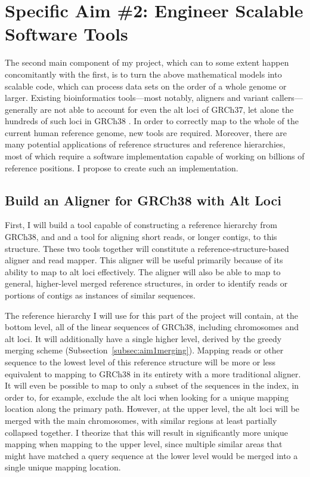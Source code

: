 \documentclass[11pt,proposal]{ucthesis}
\begin{document}
        
\section{Specific Aim \#2: Engineer Scalable Software Tools}
\label{sec:aim2}

The second main component of my project, which can to some extent happen concomitantly with the first, is to turn the above mathematical models into scalable code, which can process data sets on the order of a whole genome or larger. Existing bioinformatics tools---most notably, aligners and variant callers---generally are not able to account for even the alt loci of GRCh37, let alone the hundreds of such loci in GRCh38 \cite{church2014story}. In order to correctly map to the whole of the current human reference genome, new tools are required. Moreover, there are many potential applications of reference structures and reference hierarchies, most of which require a software implementation capable of working on billions of reference positions. I propose to create such an implementation.

\subsection{Build an Aligner for GRCh38 with Alt Loci}
\label{subsec:aim2aligner}

First, I will build a tool capable of constructing a reference hierarchy from GRCh38, and and a tool for aligning short reads, or longer contigs, to this structure. These two tools together will constitute a reference-structure-based aligner and read mapper. This aligner will be useful primarily because of its ability to map to alt loci effectively. The aligner will also be able to map to general, higher-level merged reference structures, in order to identify reads or portions of contigs as instances of similar sequences.

The reference hierarchy I will use for this part of the project will contain, at the bottom level, all of the linear sequences of GRCh38, including chromosomes and alt loci. It will additionally have a single higher level, derived by the greedy merging scheme (Subsection~\ref{subsec:aim1merging}). Mapping reads or other sequence to the lowest level of this reference structure will be more or less equivalent to mapping to GRCh38 in its entirety with a more traditional aligner. It will even be possible to map to only a subset of the sequences in the index, in order to, for example, exclude the alt loci when looking for a unique mapping location along the primary path. However, at the upper level, the alt loci will be merged with the main chromosomes, with similar regions at least partially collapsed together. I theorize that this will result in significantly more unique mapping when mapping to the upper level, since multiple similar areas that might have matched a query sequence at the lower level would be merged into a single unique mapping location.
\end{document}
